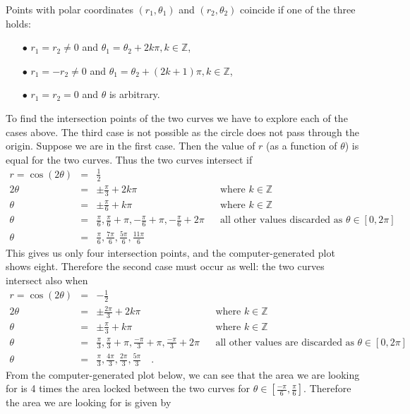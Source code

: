 {\begin{itemize}
Points with polar coordinates $(r_1, \theta_1) $ and $(r_2,\theta_2)$ coincide if one of the three holds:
\begin{itemize}
\item[$\bullet$] $r_1=r_2\neq 0$ and $\theta_1=\theta_2+2k\pi, k\in \mathbb Z $,
\item[$\bullet$] $r_1=-r_2\neq 0$ and $\theta_1=\theta_2+(2k+1)\pi, k\in \mathbb Z$,
\item[$\bullet$] $r_1=r_2=0 $ and $\theta$ is arbitrary.
\end{itemize}
To find the intersection points of the two curves we have to explore each of the cases above. The third case is not possible as the circle does not pass through the origin. Suppose we are in the first case. Then the value of $r$ (as a function of $\theta$)  is equal for the two curves. Thus the two curves intersect if 
\[
\begin{array}{rcll|l}
r=\cos (2\theta)&=&\frac12\\
2\theta&=& \pm\frac{\pi}{3}+2k\pi&&\text{where }k\in \mathbb Z\\
\theta &=& \pm\frac{\pi}{6}+k\pi &&\text{where }k\in \mathbb Z\\
\theta &=& \frac{\pi}{6}, \frac{\pi}{6}+\pi, -\frac{\pi }{6}+\pi, -\frac{\pi }{6}+2\pi &&\text{all other values discarded as }\theta\in [0,2\pi]\\
\theta&=&\frac{\pi}{6}, \frac{7\pi}{6}, \frac{5\pi}{6}, \frac{11\pi}{6}
\end{array}
\]
This gives us only four intersection points, and the computer-generated plot shows eight. Therefore the second case must occur as well: the two curves intersect also when 
\[
\begin{array}{rcll|l}
r=\cos (2\theta)&=&-\frac{1}{2}\\
2\theta &=& \pm \frac{2\pi}{3} +2k\pi &&\text{where } k\in \mathbb Z\\
\theta &=& \pm \frac{\pi}{3} +k\pi &&\text{where } k\in \mathbb Z\\
\theta&=& \frac{\pi }{3}, \frac{\pi}{3}+\pi, \frac{-\pi}{3} +\pi, \frac{-\pi}{3}+2\pi &&\text{all other values are discarded as }\theta \in [0,2\pi]\\
\theta&=&\frac{\pi}{3}, \frac{4\pi}3, \frac{2\pi}{3}, \frac{5\pi}{3}  \quad .
\end{array}
\]
From the computer-generated plot below, we can see that the area we are looking for is 4 times the area locked between the two curves for $\theta\in \left[\frac{-\pi}{6}, \frac{\pi}{6}\right] $. Therefore the area we are looking for is given by

\end{itemize}}
